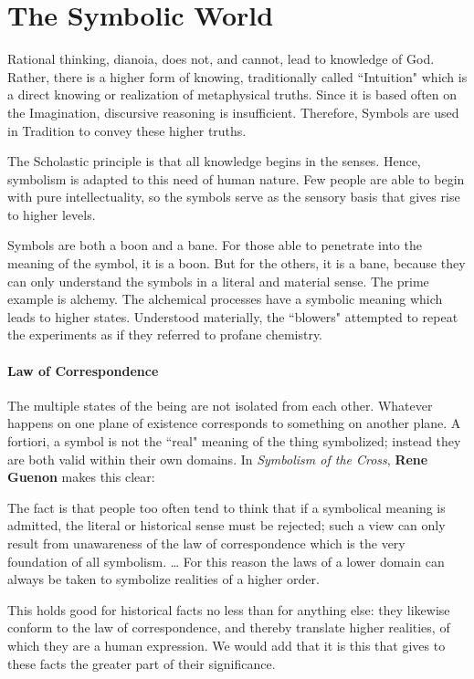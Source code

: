 \section{The Symbolic World}

Rational thinking, dianoia, does not, and cannot, lead to knowledge of God. Rather, there is a higher form of knowing, traditionally called ``Intuition" which is a direct knowing or realization of metaphysical truths. Since it is based often on the Imagination, discursive reasoning is insufficient. Therefore, Symbols are used in Tradition to convey these higher truths.

The Scholastic principle is that all knowledge begins in the senses. Hence, symbolism is adapted to this need of human nature. Few people are able to begin with pure intellectuality, so the symbols serve as the sensory basis that gives rise to higher levels.

Symbols are both a boon and a bane. For those able to penetrate into the meaning of the symbol, it is a boon. But for the others, it is a bane, because they can only understand the symbols in a literal and material sense. The prime example is alchemy. The alchemical processes have a symbolic meaning which leads to higher states. Understood materially, the ``blowers" attempted to repeat the experiments as if they referred to profane chemistry.

\paragraph{Law of Correspondence}

The multiple states of the being are not isolated from each other. Whatever happens on one plane of existence corresponds to something on another plane. A fortiori, a symbol is not the ``real" meaning of the thing symbolized; instead they are both valid within their own domains. In \emph{Symbolism of the Cross}, \textbf{Rene Guenon} makes this clear:

\begin{quotex}
The fact is that people too often tend to think that if a symbolical meaning is admitted, the literal or historical sense must be rejected; such a view can only result from unawareness of the law of correspondence which is the very foundation of all symbolism. … For this reason the laws of a lower domain can always be taken to symbolize realities of a higher order. 

\end{quotex}
This holds good for historical facts no less than for anything else: they likewise conform to the law of correspondence, and thereby translate higher realities, of which they are a human expression. We would add that it is this that gives to these facts the greater part of their significance.

